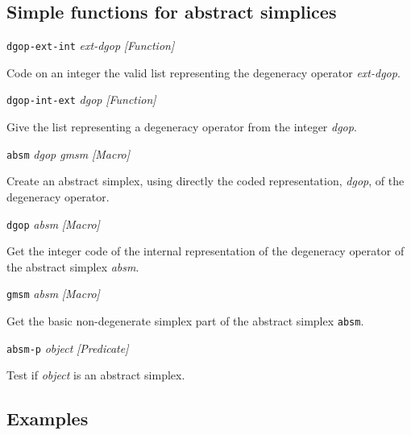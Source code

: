 \subsection {Simple functions for abstract simplices}

{\parindent=0mm
{\leftskip=5mm 
{\tt dgop-ext-int} {\em ext-dgop} \hfill {\em [Function]}\par}
{\leftskip=15mm 
Code on an integer the valid list representing the degeneracy o\-pe\-ra\-tor {\em ext-dgop}. \par}
{\leftskip=5mm 
{\tt dgop-int-ext} {\em dgop} \hfill {\em [Function]}\par}
{\leftskip=15mm 
Give the list representing a degeneracy operator from the integer {\em dgop}. \par}
{\leftskip=5mm 
{\tt absm} {\em dgop gmsm} \hfill {\em [Macro]}\par}
{\leftskip=15mm 
Create an abstract simplex, using directly the coded representation, {\em dgop}, of the degeneracy operator. \par}
{\leftskip=5mm 
{\tt dgop} {\em absm} \hfill {\em [Macro]}\par}
{\leftskip=15mm 
Get the integer code of the internal representation of the degeneracy operator of the
abstract simplex {\em absm}. \par}
{\leftskip=5mm 
{\tt gmsm} {\em absm} \hfill {\em [Macro]}\par}
{\leftskip=15mm 
Get the basic non-degenerate simplex part of the abstract simplex {\tt absm}. \par}
{\leftskip=5mm 
{\tt absm-p} {\em object} \hfill {\em [Predicate]}\par}
{\leftskip=15mm 
Test if {\em object} is an abstract simplex. \par}
}

\subsection* {Examples} 

